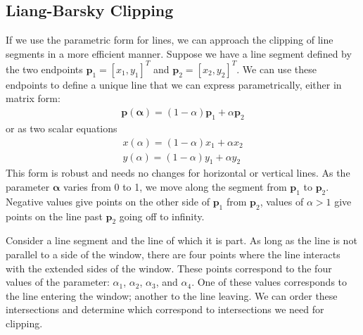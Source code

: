 \documentclass[../COS3712_Notes.tex]{subfiles}
\begin{document}
      \subsection{Liang-Barsky Clipping}
        If we use the parametric form for lines, we can approach the clipping of line segments
        in a more efficient manner.
        Suppose we have a line segment defined by the two endpoints
        $\mathbf{p}_1 = [x_1, y_1]^{T}$ and $\mathbf{p}_2 = [x_2, y_2]^{T}$.
        We can use these endpoints to define a unique line that we can express parametrically,
        either in matrix form:
        \begin{align*}
          \mathbf{p}(\mathbf{\alpha}) = (1 - \alpha)\mathbf{p}_1 + \alpha \mathbf{p}_2
        \end{align*}
        or as two scalar equations
        \begin{align*}
          x(\alpha) = (1 - \alpha)x_1 + \alpha x_2 \\
          y(\alpha) = (1 - \alpha)y_1 + \alpha y_2
        \end{align*}
        This form is robust and needs no changes for horizontal or vertical lines.
        As the parameter $\mathbf{\alpha}$ varies from 0 to 1, we move along the segment from
        $\mathbf{p}_1$ to $\mathbf{p}_2$.
        Negative values give points on the other side of $\mathbf{p}_1$ from $\mathbf{p}_2$,
        values of $\alpha > 1$ give points on the line past $\mathbf{p}_2$ going off to infinity.

        Consider a line segment and the line of which it is part.
        As long as the line is not parallel to a side of the window,
        there are four points where the line interacts with the extended sides of the window.
        These points correspond to the four values of the parameter: $\alpha_1$, $\alpha_2$,
        $\alpha_3$, and $\alpha_4$.
        One of these values corresponds to the line entering the window; another to the line
        leaving.
        We can order these intersections and determine which correspond to intersections
        we need for clipping.
\end{document}
